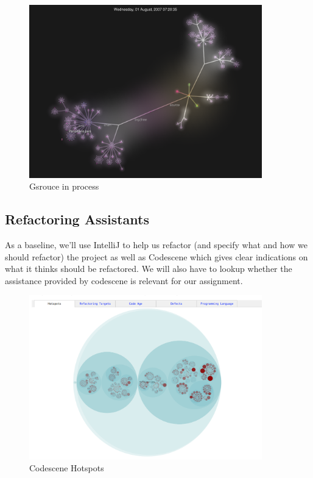 \documentclass{article}
\begin{document}
\begin{figure}[H]
\centering
	\includegraphics[width=0.9\textwidth]{gsource.png}
	\caption{Gsrouce in process}
\end{figure}

\newpage
\subsection{Refactoring Assistants}

As a baseline, we'll use IntelliJ to help us refactor (and specify what and how we should refactor) the project as well as Codescene which gives clear indications on what it thinks should be refactored. We will also have to lookup whether the assistance provided by codescene is relevant for our assignment.

\begin{figure}[H]
\centering
	\includegraphics[width=0.9\textwidth]{codescene_hotspots.png}
	\caption{Codescene Hotspots}
\end{figure}
\end{document}
